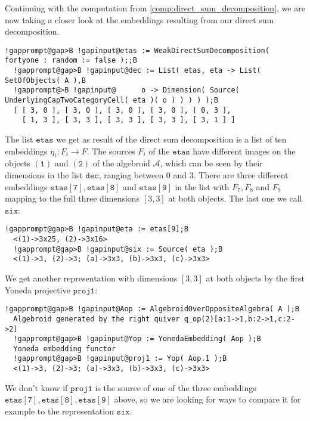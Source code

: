 \begin{computation}
Continuing with the computation from \ref{comp:direct_sum_decomposition}, we are now taking a closer look at the embeddings
resulting from our direct sum decomposition.
\begin{Verbatim}[commandchars=!@B,fontsize=\small,frame=single,label=Example]
  !gapprompt@gap>B !gapinput@etas := WeakDirectSumDecomposition( fortyone : random := false );;B
  !gapprompt@gap>B !gapinput@dec := List( etas, eta -> List( SetOfObjects( A ),B
  !gapprompt@>B !gapinput@      o -> Dimension( Source( UnderlyingCapTwoCategoryCell( eta )( o ) ) ) ) );B
  [ [ 3, 0 ], [ 3, 0 ], [ 3, 0 ], [ 3, 0 ], [ 0, 3 ],
    [ 1, 3 ], [ 3, 3 ], [ 3, 3 ], [ 3, 3 ], [ 3, 1 ] ]
\end{Verbatim}
The list $\mathtt{etas}$ we get as result of the direct sum decomposition is a list of ten embeddings $\eta_{i} : F_{i} \rightarrow F$.
The sources $F_{i}$ of the $\mathtt{etas}$ have different images on the objects $\mathtt{(1)}$ and $\mathtt{(2)}$ of the algebroid $\mathcal{A}$,
which can be seen by their dimensions in the list $\mathtt{dec}$, ranging between $0$ and $3$.
There are three different embeddings $\mathtt{etas[7], etas[8]}$ and $\mathtt{etas[9]}$ in the list with $F_{7}, F_{8}$ and $F_{9}$
mapping to the full three dimensions $[ 3, 3 ]$ at both objects. The last one we call $\mathtt{six}$:
\begin{Verbatim}[commandchars=!@B,fontsize=\small,frame=single,label=Example]
  !gapprompt@gap>B !gapinput@eta := etas[9];B
  <(1)->3x25, (2)->3x16>
  !gapprompt@gap>B !gapinput@six := Source( eta );B
  <(1)->3, (2)->3; (a)->3x3, (b)->3x3, (c)->3x3>
\end{Verbatim}
We get another representation with dimensions $[ 3, 3 ]$ at both objects by the first Yoneda projective $\mathtt{proj1}$:
\begin{Verbatim}[commandchars=!@B,fontsize=\small,frame=single,label=Example]
  !gapprompt@gap>B !gapinput@Aop := AlgebroidOverOppositeAlgebra( A );B
  Algebroid generated by the right quiver q_op(2)[a:1->1,b:2->1,c:2->2]
  !gapprompt@gap>B !gapinput@Yop := YonedaEmbedding( Aop );B
  Yoneda embedding functor
  !gapprompt@gap>B !gapinput@proj1 := Yop( Aop.1 );B
  <(1)->3, (2)->3; (a)->3x3, (b)->3x3, (c)->3x3>
\end{Verbatim}
We don't know if $\mathtt{proj1}$ is the source of one of the three embeddings $\mathtt{etas[7], etas[8], etas[9]}$ above, so
we are looking for ways to compare it for example to the representation $\mathtt{six}$.


\end{computation}
